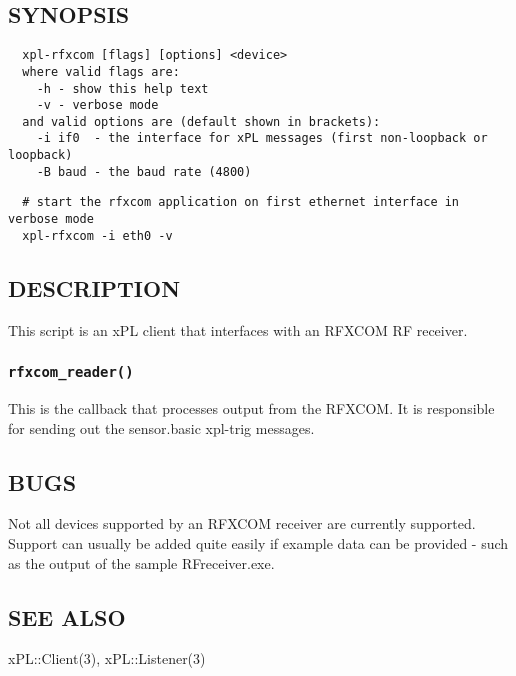 \documentclass[12pt,a4paper]{article}
\begin{document}
\subsection*{SYNOPSIS\label{xpl-rfxcom_SYNOPSIS}}
\begin{verbatim}
  xpl-rfxcom [flags] [options] <device>
  where valid flags are:
    -h - show this help text
    -v - verbose mode
  and valid options are (default shown in brackets):
    -i if0  - the interface for xPL messages (first non-loopback or loopback)
    -B baud - the baud rate (4800)
\end{verbatim}
\begin{verbatim}
  # start the rfxcom application on first ethernet interface in verbose mode
  xpl-rfxcom -i eth0 -v
\end{verbatim}
\subsection*{DESCRIPTION\label{xpl-rfxcom_DESCRIPTION}}


This script is an xPL client that interfaces with an RFXCOM RF receiver.

\subsubsection*{\texttt{rfxcom\_reader()}\label{xpl-rfxcom_rfxcom_reader_}}


This is the callback that processes output from the RFXCOM.  It is
responsible for sending out the sensor.basic xpl-trig messages.

\subsection*{BUGS\label{xpl-rfxcom_BUGS}}


Not all devices supported by an RFXCOM receiver are currently
supported.  Support can usually be added quite easily if example data
can be provided - such as the output of the sample RFreceiver.exe.

\subsection*{SEE ALSO\label{xpl-rfxcom_SEE_ALSO}}


xPL::Client(3), xPL::Listener(3)
\end{document}
